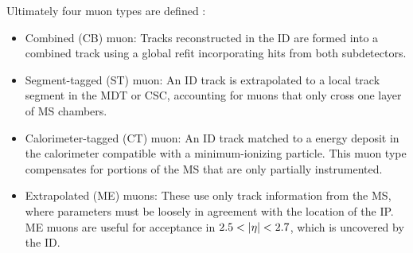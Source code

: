 Ultimately four muon types are defined \cite{muon-reco}:
\begin{itemize}
    \item Combined (CB) muon: Tracks reconstructed in the \gls{ID} are formed into a combined track using a global refit incorporating hits from both subdetectors.
    \item Segment-tagged (ST) muon: An \gls{ID} track is extrapolated to a local track segment in the \gls{MDT} or \gls{CSC}, accounting for muons that only cross one layer of \gls{MS} chambers.
    \item Calorimeter-tagged (CT) muon: An \gls{ID} track matched to a energy deposit in the calorimeter compatible with a minimum-ionizing particle. This muon type compensates for portions of the \gls{MS} that are only partially instrumented.
    \item Extrapolated (ME) muons: These use only track information from the \gls{MS}, where parameters must be loosely in agreement with the location of the \gls{IP}. ME muons are useful for acceptance in $2.5 < |\eta| < 2.7$, which is uncovered by the \gls{ID}.
\end{itemize}